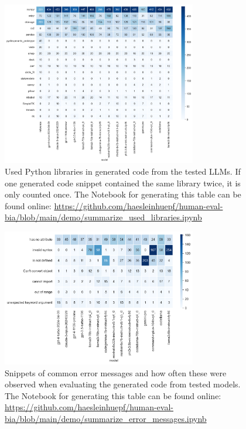 \documentclass{ecai}
\begin{document}
\begin{figure}[h]
    \includegraphics[width=8.5cm]{used_libraries_heatmap.png}
    \caption{Used Python libraries in generated code from the tested LLMs. If one generated code snippet contained the same library twice, it is only counted once. The Notebook for generating this table can be found online: \url{https://github.com/haesleinhuepf/human-eval-bia/blob/main/demo/summarize_used_libraries.ipynb}
    \newline
    \newline }
    \label{fig:usedlibraries}
    \end{figure}

%

\begin{figure}[h]
    \includegraphics[width=8.5cm]{error_counts_heatmap.png}
    \caption{Snippets of common error messages and how often these were observed when evaluating the generated code from tested models. The Notebook for generating this table can be found online: \url{https://github.com/haesleinhuepf/human-eval-bia/blob/main/demo/summarize_error_messages.ipynb} 
    \newline
    \newline}
    \label{fig:commonerrors}
    \end{figure}
\end{document}
